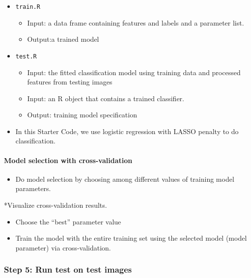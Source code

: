 \documentclass[
]{article}
\providecommand{\tightlist}{%
  \setlength{\itemsep}{0pt}\setlength{\parskip}{0pt}}
\begin{document}
\begin{itemize}
\tightlist
\item
  \texttt{train.R}

  \begin{itemize}
  \tightlist
  \item
    Input: a data frame containing features and labels and a parameter
    list.
  \item
    Output:a trained model
  \end{itemize}
\item
  \texttt{test.R}

  \begin{itemize}
  \tightlist
  \item
    Input: the fitted classification model using training data and
    processed features from testing images
  \item
    Input: an R object that contains a trained classifier.
  \item
    Output: training model specification
  \end{itemize}
\item
  In this Starter Code, we use logistic regression with LASSO penalty to
  do classification.
\end{itemize}

\hypertarget{model-selection-with-cross-validation-2}{%
\paragraph{Model selection with
cross-validation}\label{model-selection-with-cross-validation-2}}

\begin{itemize}
\tightlist
\item
  Do model selection by choosing among different values of training
  model parameters.
\end{itemize}

*Visualize cross-validation results.

\begin{itemize}
\item
  Choose the ``best'' parameter value
\item
  Train the model with the entire training set using the selected model
  (model parameter) via cross-validation.
\end{itemize}

\hypertarget{step-5-run-test-on-test-images-2}{%
\subsubsection{Step 5: Run test on test
images}\label{step-5-run-test-on-test-images-2}}
\end{document}
